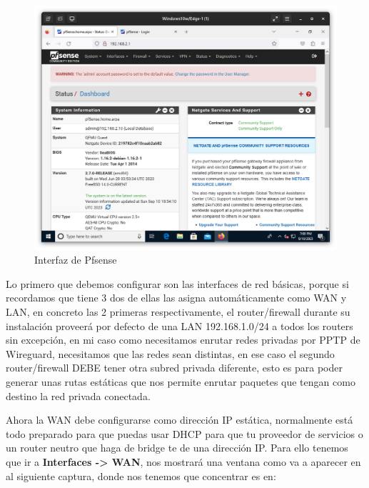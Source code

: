 \begin{figure}[H]
	\centering
	\includegraphics[scale=0.30]{01}
	\caption{Interfaz de Pfsense}
\end{figure}

Lo primero que debemos configurar son las interfaces de red básicas, porque si recordamos que tiene 3 dos de ellas las asigna automáticamente como WAN y LAN, en concreto las 2 primeras respectivamente, el router/firewall durante su instalación proveerá por defecto de una LAN 192.168.1.0/24 a todos los routers sin excepción, en mi caso como necesitamos enrutar redes privadas por PPTP de Wireguard, necesitamos que las redes sean distintas, en ese caso el segundo router/firewall DEBE tener otra subred privada diferente, esto es para poder generar unas rutas estáticas que nos permite enrutar paquetes que tengan como destino la red privada conectada.
\vspace{5mm}

Ahora la WAN debe configurarse como dirección IP estática, normalmente está todo preparado para que puedas usar DHCP para que tu proveedor de servicios o un router neutro que haga de bridge te de una dirección IP. Para ello tenemos que ir a \textbf{Interfaces -> WAN}, nos mostrará una ventana como va a aparecer en al siguiente captura, donde nos tenemos que concentrar es en: 

